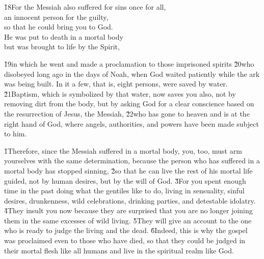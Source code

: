 \begin{poetry}
\poeml \v{18}For the Messiah also suffered for sins once for all, \\
\poemll    an innocent person for the guilty, \\
\poemlll       so that he could bring you to God. \\
\poeml He was put to death in a mortal body \\
\poemll    but was brought to life by the Spirit,
\end{poetry}

\v{19}in which he went and made a proclamation to those imprisoned spirits \v{20}who disobeyed long ago in the days of Noah, when God waited patiently while the ark was being built. In it a few, that is, eight persons, were saved by water. \v{21}Baptism, which is symbolized by that water, now saves you also, not by removing dirt from the body, but by asking God for a clear conscience based on the resurrection of Jesus, the Messiah, \v{22}who has gone to heaven and is at the right hand of God, where angels, authorities, and powers have been made subject to him.

\v{1}Therefore, since the Messiah suffered in a mortal body, you, too, must arm yourselves with the same determination, because the person who has suffered in a mortal body has stopped sinning, \v{2}so that he can live the rest of his mortal life guided, not by human desires, but by the will of God. \v{3}For you spent enough time in the past doing what the gentiles like to do, living in sensuality, sinful desires, drunkenness, wild celebrations, drinking parties, and detestable idolatry. \v{4}They insult you now because they are surprised that you are no longer joining them in the same excesses of wild living. \v{5}They will give an account to the one who is ready to judge the living and the dead. \v{6}Indeed, this is why the gospel was proclaimed even to those who have died, so that they could be judged in their mortal flesh like all humans and live in the spiritual realm like God.

